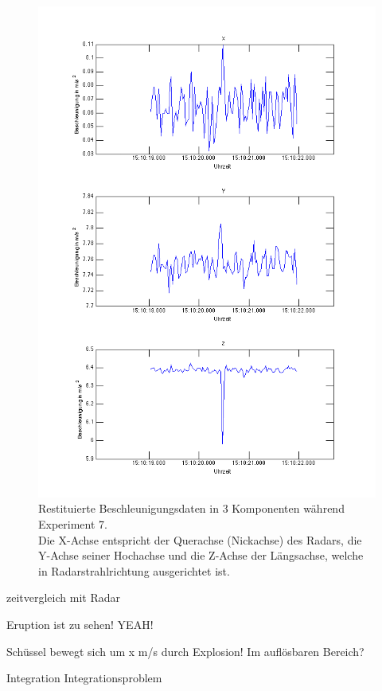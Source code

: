 \documentclass[12pt,a4paper]{scrartcl}
\begin{document}
\begin{figure}[H]
\centering
\includegraphics[scale=.5]{wakiki/firstexample2.png}
\caption{Restituierte Beschleunigungsdaten in 3 Komponenten während Experiment 7.\\ Die X-Achse entspricht der Querachse (Nickachse) des Radars, die Y-Achse seiner Hochachse und die Z-Achse der Längsachse, welche in Radarstrahlrichtung ausgerichtet ist. }
\label{firstexample}
\end{figure}



zeitvergleich mit Radar

Eruption ist zu sehen! YEAH!



Schüssel bewegt sich um x m/s durch Explosion! Im auflösbaren Bereich? 


Integration Integrationsproblem
\end{document}
